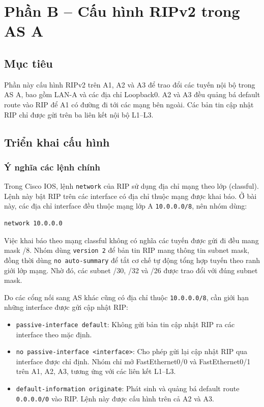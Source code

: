 
\section{Phần B -- Cấu hình RIPv2 trong AS A}

\subsection{Mục tiêu}

Phần này cấu hình RIPv2 trên A1, A2 và A3
để trao đổi các tuyến nội bộ trong AS A,
bao gồm LAN-A và các địa chỉ Loopback0.
A2 và A3 đều quảng bá default route vào RIP
để A1 có đường đi tới các mạng bên ngoài.
Các bản tin cập nhật RIP chỉ được gửi
trên ba liên kết nội bộ L1--L3.

\subsection{Triển khai cấu hình}

\subsubsection{Ý nghĩa các lệnh chính}

Trong Cisco IOS, lệnh \texttt{network} của RIP
sử dụng địa chỉ mạng theo lớp (classful).
Lệnh này bật RIP trên các interface có
địa chỉ thuộc mạng được khai báo.
Ở bài này, các địa chỉ interface đều thuộc
mạng lớp A \texttt{10.0.0.0/8}, nên nhóm dùng:

\begin{lstlisting}
network 10.0.0.0
\end{lstlisting}

Việc khai báo theo mạng classful không có nghĩa
các tuyến được gửi đi đều mang mask /8.
Nhóm dùng \texttt{version 2} để bản tin RIP
mang thông tin subnet mask, đồng thời dùng
\texttt{no auto-summary} để tắt cơ chế
tự động tổng hợp tuyến theo ranh giới lớp mạng.
Nhờ đó, các subnet /30, /32 và /26
được trao đổi với đúng subnet mask.

Do các cổng nối sang AS khác cũng có địa chỉ
thuộc \texttt{10.0.0.0/8}, cần giới hạn
những interface được gửi cập nhật RIP:

\begin{itemize}
    \item \texttt{passive-interface default}:
    Không gửi bản tin cập nhật RIP
    ra các interface theo mặc định.

    \item \texttt{no passive-interface <interface>}:
    Cho phép gửi lại cập nhật RIP
    qua interface được chỉ định.
    Nhóm chỉ mở FastEthernet0/0 và
    FastEthernet0/1 trên A1, A2, A3,
    tương ứng với các liên kết L1--L3.

    \item \texttt{default-information originate}:
    Phát sinh và quảng bá default route
    \texttt{0.0.0.0/0} vào RIP.
    Lệnh này được cấu hình trên cả A2 và A3.
\end{itemize}

